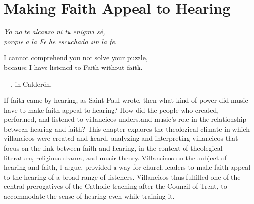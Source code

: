 
%
%
%



\chapter{Making Faith Appeal to Hearing}
\label{ch:faith-hearing}

\begin{epigraph}
    \emph{Yo no te alcanzo ni tu enigma sé,} \\
    \emph{porque a la Fe he escuchado sin la fe.} \\
    \addlinespace

    I cannot comprehend you nor solve your puzzle, \\
    because I have listened to Faith without faith. \\
    \addlinespace

    ---, in Calderón, %
        \Autocite[]{Calderon:Retiro}
\end{epigraph}

If faith came by hearing, as Saint Paul wrote, then what kind of power did music
have to make faith appeal to hearing?
How did the people who created, performed, and listened to villancicos
understand music's role in the relationship between hearing and faith?
This chapter explores the theological climate in which villancicos were created
and heard, analyzing and interpreting villancicos that focus on the link between
faith and hearing, in the context of theological literature, religious drama,
and music theory.
Villancicos on the subject of hearing and faith, I argue, provided a way for
church leaders to make faith appeal to the hearing of a broad range of
listeners.
Villancicos thus fulfilled one of the central prerogatives of the Catholic
teaching after the Council of Trent, to accommodate the sense of
hearing even while training it.

